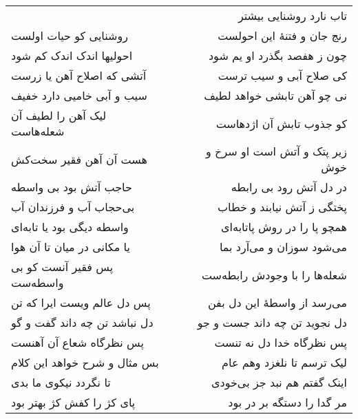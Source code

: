 \begin{center}
\begin{longtable}{l p{0.5cm} r}
&&
تاب نارد روشنایی بیشتر
\\
روشنایی کو حیات اولست
&&
رنج جان و فتنهٔ این احولست
\\
احولیها اندک اندک کم شود
&&
چون ز هفصد بگذرد او یم شود
\\
آتشی که اصلاح آهن یا زرست
&&
کی صلاح آبی و سیب ترست
\\
سیب و آبی خامیی دارد خفیف
&&
نی چو آهن تابشی خواهد لطیف
\\
لیک آهن را لطیف آن شعله‌هاست
&&
کو جذوب تابش آن اژدهاست
\\
هست آن آهن فقیر سخت‌کش
&&
زیر پتک و آتش است او سرخ و خوش
\\
حاجب آتش بود بی واسطه
&&
در دل آتش رود بی رابطه
\\
بی‌حجاب آب و فرزندان آب
&&
پختگی ز آتش نیابند و خطاب
\\
واسطه دیگی بود یا تابه‌ای
&&
همچو پا را در روش پاتابه‌ای
\\
یا مکانی در میان تا آن هوا
&&
می‌شود سوزان و می‌آرد بما
\\
پس فقیر آنست کو بی واسطه‌ست
&&
شعله‌ها را با وجودش رابطه‌ست
\\
پس دل عالم ویست ایرا که تن
&&
می‌رسد از واسطهٔ این دل بفن
\\
دل نباشد تن چه داند گفت و گو
&&
دل نجوید تن چه داند جست و جو
\\
پس نظرگاه شعاع آن آهنست
&&
پس نظرگاه خدا دل نه تنست
\\
بس مثال و شرح خواهد این کلام
&&
لیک ترسم تا نلغزد وهم عام
\\
تا نگردد نیکوی ما بدی
&&
اینک گفتم هم نبد جز بی‌خودی
\\
پای کژ را کفش کژ بهتر بود
&&
مر گدا را دستگه بر در بود
\\
\end{longtable}
\end{center}
